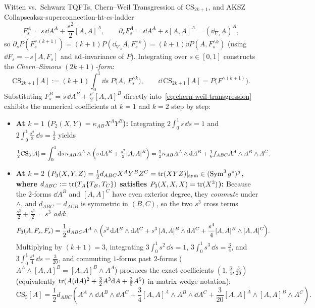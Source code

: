 \begin{zkmodule}{Witten vs.\ Schwarz TQFTs, Chern--Weil Transgression of $\mathrm{CS}_{2k+1}$, and AKSZ Collapse}{aksz-superconnection-ht-cs-ladder}
\begin{equation}
\label{eq:Fs-linear-path}
F_s^A = s\,\dd A^A + \frac{s^2}{2}[A, A]^A,\qquad
\partial_s F_s^A = \dd A^A + s[A, A]^A = (\dd_{\nabla_s}A)^A,
\end{equation}
so $\partial_s P(F_s^{\wedge(k+1)}) = (k+1)P(\dd_{\nabla_s}A, F_s^{\wedge k}) = (k+1)\dd P(A, F_s^{\wedge k})$ (using $\dd F_s = -s[A, F_s]$ and $\operatorname{ad}$-invariance of $P$). Integrating over $s \in [0,1]$ constructs the \emph{Chern--Simons $(2k+1)$-form}:
\begin{equation}
\label{eq:chern-weil-transgression}
\mathrm{CS}_{2k+1}[A] := (k+1)\int_0^1 \dd s\; P\!\bigl(A,\, F_s^{\wedge k}\bigr),\qquad
\dd\,\mathrm{CS}_{2k+1}[A] = P\!\bigl(F^{\wedge(k+1)}\bigr).
\end{equation}
Substituting $F_s^B = s\,\dd A^B + \frac{s^2}{2}[A,A]^B$ directly into~\eqref{eq:chern-weil-transgression} exhibits the numerical coefficients at $k = 1$ and $k = 2$ step by step:
\begin{itemize}[leftmargin=*]
  \item \textbf{At $k = 1$ ($P_2(X,Y) = \kappa_{AB}X^A Y^B$):} Integrating $2\int_0^1 s\,\dd s = 1$ and $2\int_0^1\frac{s^2}{2}\,\dd s = \frac{1}{3}$ yields
  \begin{equation}
  \label{eq:cs3-explicit}
  \tfrac{1}{2}\mathrm{CS}_3[A] = \int_0^1\mathrm{d} s\,\kappa_{AB}A^A\wedge\Bigl(s\,\mathrm{d} A^B + \tfrac{s^2}{2}[A,A]^B\Bigr) = \tfrac{1}{2}\kappa_{AB}A^A\wedge\mathrm{d} A^B + \tfrac{1}{6}f_{ABC}A^A\wedge A^B\wedge A^C.
  \end{equation}
  \item \textbf{At $k = 2$ ($P_3(X,Y,Z) = \frac{1}{2}d_{ABC}X^A Y^B Z^C = \operatorname{tr}(X Y Z)|_{\mathrm{sym}} \in (\operatorname{Sym}^3g^*)^{g}$, where $d_{ABC} := \operatorname{tr}(T_A\{T_B,T_C\})$ satisfies $P_3(X,X,X) = \operatorname{tr}(X^3)$):} Because the $2$-forms $\dd A^B$ and $[A,A]^C$ have even exterior degree, they \emph{commute} under $\wedge$, and $d_{ABC} = d_{ACB}$ is symmetric in $(B,C)$, so the two $s^3$ cross terms $\frac{s^3}{2} + \frac{s^3}{2} = s^3$ \emph{add}:
  \[
  P_3(A, F_s, F_s) = \frac{1}{2}d_{ABC}A^A\wedge\Bigl(s^2\,\mathrm{d} A^B\wedge\mathrm{d} A^C + s^3\,[A,A]^B\wedge\mathrm{d} A^C + \frac{s^4}{4}[A,A]^B\wedge[A,A]^C\Bigr).
  \]
  Multiplying by $(k+1) = 3$, integrating $3\int_0^1 s^2\,\dd s = 1$, $3\int_0^1 s^3\,\dd s = \frac{3}{4}$, and $3\int_0^1\frac{s^4}{4}\,\dd s = \frac{3}{20}$, and commuting $1$-forms past $2$-forms ($A^A\wedge[A,A]^B = [A,A]^B\wedge A^A$) produces the exact coefficients $(1, \frac{3}{4}, \frac{3}{20})$ (equivalently $\operatorname{tr}(A(\mathrm{d} A)^2 + \frac{3}{2}A^3\mathrm{d} A + \frac{3}{5}A^5)$ in matrix wedge notation):
  \begin{equation}
  \label{eq:cs5-explicit}
  \mathrm{CS}_5[A] = \frac{1}{2}d_{ABC}\!\left(A^A\wedge\dd A^B\wedge\dd A^C + \frac{3}{4}[A,A]^A\wedge A^B\wedge\dd A^C + \frac{3}{20}[A,A]^A\wedge[A,A]^B\wedge A^C\right).
  \end{equation}
\end{itemize}


\end{zkmodule}

